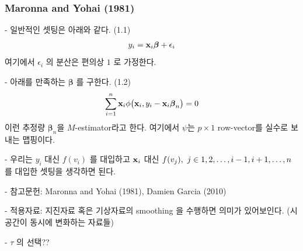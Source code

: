 \documentclass[preprint, review, 12pt]{article}
\theoremstyle{definition}
\theoremstyle{remark}
\begin{document}
\subsubsection*{Maronna and Yohai (1981)}

- 일반적인 셋팅은 아래와 같다. (1.1) 
\begin{align}
y_i={\bf x}_ i \boldsymbol{\beta}  +\epsilon_i 
\end{align}
여기에서 $\epsilon_i$ 의 분산은 편의상 $1$ 로 가정한다. 

- 아래를 만족하는 $\boldsymbol{\beta}$ 를 구한다. (1.2) 
\begin{align}
\sum_{i=1}^{n}{\bf x}_ i \phi\big({\bf x}_ i , y_i-{\bf x}_ i \boldsymbol{\beta}_ n\big) =0 
\end{align}
이런 추정량 $\boldsymbol{\beta}_ n$을 $M$-estimator라고 한다. 여기에서 $\psi$는 $p\times 1$ row-vector를 실수로 보내는 맵핑이다. 

- 우리는 $y_i$ 대신 $f(v_i)$ 를 대입하고 ${\bf x}_ i$ 대신 $f(v_j),~ j\in\\{1,2,\dots,i-1,i+1,\dots,n\\}$ 를 대입한 셋팅을 생각하면 된다. 

- 참고문헌: Maronna and Yohai (1981), Damien Garcia (2010) 

- 적용자료: 지진자료 혹은 기상자료의 smoothing 을 수행하면 의미가 있어보인다. (시공간이 동시에 변화하는 자료들) 

- $\tau$ 의 선택??
\end{document}
